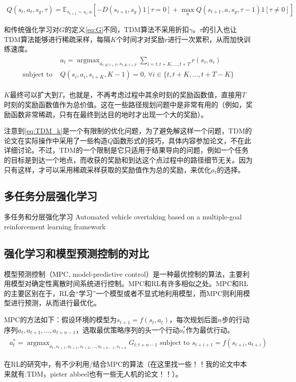 \documentclass[degree=bachelor, tocarialchapter, pifootnote]{thuthesis}
\DeclareMathOperator*{\argmax}{argmax}
\begin{document}
    \begin{align}
      Q(s_t, a_t, s_g, \tau) = \mathbb{E}_{s_{t+1} \sim s_t, a}[-D(s_{t+1}, s_g)1[\tau = 0] + \max_a Q(s_{t+1}, a, s_g, \tau - 1)1[\tau \neq 0]]
    \end{align}
    \par 和传统强化学习对$G$的定义\eqref{eq:G}不同，TDM算法不采用折扣$\gamma$。$\tau$的引入也让TDM算法能够进行稀疏采样，每隔$K$个时间才对奖励$r$进行一次累积，从而加快训练速度。
    \begin{align}
    \begin{aligned}
      & a_t = \argmax_{a_{t:K:t+T}, s_{t:K:t+T}} \sum_{i = t, t+K, ..., t+T} r(s_i, a_i)\\
      \text{subject to } &Q(s_i, a_i, s_{i+K}, K-1) = 0 \text{,   } \forall i \in \{t, t+K, ..., t+T-K\} 
      \label{eq:TDM_k}
    \end{aligned}
    \end{align}
    \par $K$最终可以扩大到$T$，也就是，不再考虑过程中其余时刻的奖励函数值，直接用$T$时刻的奖励函数值作为总价值。这在一些路径规划问题中是非常有用的（例如，奖励函数非常稀疏，只有在最终到达目的地时才出现一个大的奖励）。
    \par 注意到\eqref{eq:TDM_k}是一个有限制的优化问题，为了避免解这样一个问题，TDM的论文在实际操作中采用了一些构造$Q$函数形式的技巧，具体内容参加论文\cite{TDM}，不在此详细讨论。不过，TDM的一个限制是它只适用于结果导向的问题，例如一个任务的目标是到达一个地点，而收获的奖励和到达这个点过程中的路径细节无关。因为只有这样，才可以采用稀疏采样获取的奖励值作为总的奖励，来优化$a_t$的选择。
  
  \subsection{多任务分层强化学习}
    多任务和分层强化学习
    Automated vehicle overtaking based on a multiple-goal reinforcement learning framework
    
  \subsection{强化学习和模型预测控制的对比}
  模型预测控制\cite{MPC}（MPC, model-predictive control）是一种最优控制的算法，主要利用模型对确定性离散时间系统进行控制。MPC和RL有许多相似之处。MPC和RL的主要区别在于，RL会``学习''一个模型或者不显式地利用模型，而MPC则利用模型进行预测，从而进行最优化\cite{MPC_VS_RL}。\par
  MPC的方法如下：假设环境的模型为$s_{t+1} = f(s_t, a_t)$，每次规划后面$n$步的行动序列$a_t, a_{t+1}, ..., a_{t+n-1}$，选取最优策略序列的头一个行动$a_t^*$作为最优行动。
  \begin{align}
  \begin{aligned}
        a_t^* = \argmax_{a_t, s_{t+1}, a_{t+1}, s_{t+2}, ... , a_{t+n-1}, s_{t+n}} G_{t:t+n-1}
    \text{  subject to } s_{t+i+1} = f(s_{t+i}, a_{t+i})
  \end{aligned}
  \end{align}
  \par 在RL的研究中，有不少利用/结合MPC的算法（在这里找一些！！我的论文中本来就有:TDM，pieter abbeel也有一些无人机的论文！！）。
  
\end{document}
